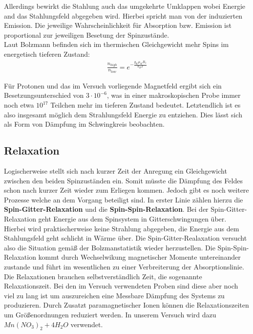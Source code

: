 \documentclass[12pt]{article}
\begin{document}
 Allerdings bewirkt die Stahlung auch das umgekehrte Umklappen wobei Energie and das Stahlungsfeld abgegeben wird. Hierbei spricht man von der induzierten Emission. Die jeweilige Wahrscheinlichkeit für Absorption bzw. Emission ist proportional zur jeweiligen Besetung der Spinzustände.\\

Laut Bolzmann befinden sich im thermischen Gleichgewicht mehr Spins im energetisch tieferen Zustand:
\begin{align}
 \frac{n_{high}}{n_{low}} = e^{-\frac{g_K \mu_K B_z}{k_B T}} 
\end{align}

Für Protonen und das im Versuch vorliegende Magnetfeld ergibt sich ein Besetzungsunterschied von $3\cdot 10^{-6}$, was in einer makroskopischen Probe immer noch etwa $10^{17}$ Teilchen mehr im tieferen Zustand bedeutet. Letztendlich ist es also insgesamt möglich dem Strahlungsfeld Energie zu entziehen. Dies lässt sich als Form von Dämpfung im Schwingkreis beobachten.

\subsection{Relaxation}
Logischerweise stellt sich nach kurzer Zeit der Anregung ein Gleichgewicht zwischen den beiden Spinzuständen ein.
Somit müsste die Dämpfung des Feldes schon nach kurzer Zeit wieder zum Erliegen kommen. Jedoch gibt es noch weitere Prozesse welche an dem Vorgang beteiligt sind. In erster Linie zählen hierzu die \textbf{Spin-Gitter-Relaxation} und die \textbf{Spin-Spin-Relaxation}. Bei der Spin-Gitter-Relaxation geht Energie aus dem Spinsystem in Gitterschwingungen über. Hierbei wird praktischerweise keine Strahlung abgegeben, die Energie aus dem Stahlungsfeld geht schlicht in Wärme über. Die Spin-Gitter-Realaxation versucht also die Situation gemäß der Bolzmanstatistik wieder herzustellen. Die Spin-Spin-Relaxation kommt durch Wechselwikung magnetischer Momente untereinander zustande und führt im wesentlichen zu einer Verbreiterung der Absorptionslinie.\\

Die Relaxationen brauchen selbstverständlich Zeit, die sogenannte Relaxationszeit. Bei den im Versuch verwendeten Proben sind diese aber noch viel zu lang ist um auszureichen eine Messbare Dämpfung des Systems zu produzieren. Durch Zusatzt paramagnetischer Ionen können die Relaxationszeiten um Größenordnungen reduziert werden. In unserem Versuch wird dazu $Mn(NO_3)_2 + 4H_2O$ verwendet.
\end{document}
